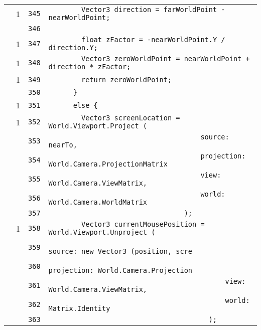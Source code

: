 \documentclass[a4paper,10pt]{article}
\begin{document}
\begin{longtable}[l]{lrrl}
\cellcolor{green} & 1 & \verb~345~ & \verb~        Vector3 direction = farWorldPoint - nearWorldPoint;~\\
\cellcolor{gray} &  & \verb~346~ & \verb~~\\
\cellcolor{green} & 1 & \verb~347~ & \verb~        float zFactor = -nearWorldPoint.Y / direction.Y;~\\
\cellcolor{green} & 1 & \verb~348~ & \verb~        Vector3 zeroWorldPoint = nearWorldPoint + direction * zFactor;~\\
\cellcolor{green} & 1 & \verb~349~ & \verb~        return zeroWorldPoint;~\\
\cellcolor{gray} &  & \verb~350~ & \verb~      }~\\
\cellcolor{green} & 1 & \verb~351~ & \verb~      else {~\\
\cellcolor{green} & 1 & \verb~352~ & \verb~        Vector3 screenLocation = World.Viewport.Project (~\\
\cellcolor{gray} &  & \verb~353~ & \verb~                                     source: nearTo,~\\
\cellcolor{gray} &  & \verb~354~ & \verb~                                     projection: World.Camera.ProjectionMatrix~\\
\cellcolor{gray} &  & \verb~355~ & \verb~                                     view: World.Camera.ViewMatrix,~\\
\cellcolor{gray} &  & \verb~356~ & \verb~                                     world: World.Camera.WorldMatrix~\\
\cellcolor{gray} &  & \verb~357~ & \verb~                                 );~\\
\cellcolor{green} & 1 & \verb~358~ & \verb~        Vector3 currentMousePosition = World.Viewport.Unproject (~\\
\cellcolor{gray} &  & \verb~359~ & \verb~                                           source: new Vector3 (position, scre~\\
\cellcolor{gray} &  & \verb~360~ & \verb~                                           projection: World.Camera.Projection~\\
\cellcolor{gray} &  & \verb~361~ & \verb~                                           view: World.Camera.ViewMatrix,~\\
\cellcolor{gray} &  & \verb~362~ & \verb~                                           world: Matrix.Identity~\\
\cellcolor{gray} &  & \verb~363~ & \verb~                                       );~\\

\end{longtable}
\end{document}
